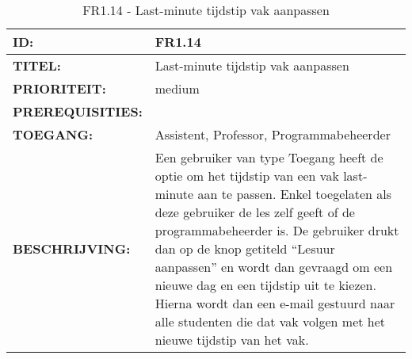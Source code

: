 \noindent\begin{table}[H]
            \begin{tabular}{l | p{10cm}}
                \textbf{ID:} & FR1.14 \\ \hline
                \textbf{TITEL:} & Last-minute tijdstip vak aanpassen\\ \hline
                \textbf{PRIORITEIT:} &  medium \\ \hline
                \textbf{PREREQUISITIES:} & \\ \hline
                \textbf{TOEGANG:} & Assistent, Professor, Programmabeheerder \\ \hline
                \textbf{BESCHRIJVING:} & Een gebruiker van type Toegang heeft de optie om het tijdstip van een vak last-minute aan te passen. Enkel toegelaten als deze gebruiker de les zelf geeft of de programmabeheerder is.  De gebruiker drukt dan op de knop getiteld “Lesuur aanpassen” en wordt dan gevraagd om een nieuwe dag en een tijdstip uit te kiezen. 
                                        Hierna wordt dan een e-mail gestuurd naar alle studenten die dat vak volgen met het nieuwe tijdstip van het vak.\\ 
            \end{tabular}\\
            \caption{FR1.14 - Last-minute tijdstip vak aanpassen}
            \label{tab:FR1.14 - Last-minute tijdstip vak aanpassen}
        \end{table}
        
